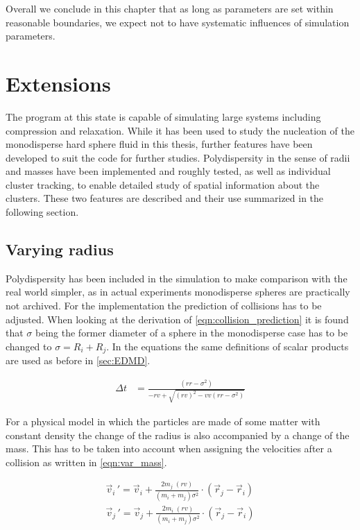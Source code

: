 Overall we conclude in this chapter that as long as parameters are set within reasonable boundaries, we expect not to have systematic influences of simulation parameters. 

\section{Extensions}
\label{sec:simulation_ext}
The program at this state is capable of simulating large systems including compression and relaxation. While it has been used to study the nucleation of the monodisperse hard sphere fluid in this thesis, further features have been developed to suit the code for further studies. Polydispersity in the sense of radii and masses have been implemented and roughly tested, as well as individual cluster tracking, to enable detailed study of spatial information about the clusters. These two features are described and their use summarized in the following section.

\subsection{Varying radius}
\label{sec:extension_radius}
Polydispersity has been included in the simulation to make comparison with the real world simpler, as in actual experiments monodisperse spheres are practically not archived. For the implementation the prediction of collisions has to be adjusted. When looking at the derivation of \autoref{eqn:collision_prediction} it is found that $\sigma$ being the former diameter of a sphere in the monodisperse case has to be changed to $\sigma=R_i+R_j$. In the equations the same definitions of scalar products are used as before in \autoref{sec:EDMD}.

\begin{align}
\label{eqn:collision_prediction2}
\Delta t &= \frac{(rr - \sigma^2 )}{ - rv + \sqrt{ (rv)^2  - vv (rr - \sigma^2 )}}
\end{align} 

For a physical model in which the particles are made of some matter with constant density the change of the radius is also accompanied by a change of the mass. This has to be taken into account when assigning the velocities after a collision as written in \autoref{eqn:var_mass}.

\begin{align}
\label{eqn:var_mass}
\vec{v}_i{\,'} = \vec{v}_i + \frac{2 m_j \; (rv)}{(m_i + m_j) \sigma^2} \cdot (\vec{r}_j - \vec{r}_i) \nonumber \\
\vec{v}_j{\,'} = \vec{v}_j + \frac{2 m_i \; (rv)}{(m_i + m_j) \sigma^2} \cdot (\vec{r}_j - \vec{r}_i)
\end{align}

